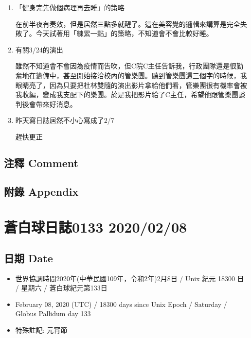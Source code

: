 \documentclass[a5paper, 12pt
]{book}
\providecommand{\tightlist}{%
  \setlength{\itemsep}{0pt}\setlength{\parskip}{0pt}}
\begin{document}
\begin{enumerate}
\def\labelenumi{\arabic{enumi}.}
\item
  「健身完先做個病理再去睡」的策略

  在前半夜有奏效，但是居然三點多就醒了。這在美容覺的邏輯來講算是完全失敗了。今天試著用「練累一點」的策略，不知道會不會比較好睡。
\item
  有關3/24的演出

  雖然不知道會不會因為疫情而告吹，但C院C主任告訴我，行政團隊還是很勤奮地在籌備中，甚至開始接洽校內的管樂團。聽到管樂團這三個字的時候，我眼睛亮了，因為只要把杜林雙隨的演出影片拿給他們看，管樂團很有機率會被我收編，變成我支配下的樂團。於是我把影片給了C主任，希望他跟管樂團談判後會帶來好消息。
\item
  昨天寫日誌居然不小心寫成了2/7

  趕快更正
\end{enumerate}

\hypertarget{ux6ce8ux91cb-comment-67}{%
\subsection{注釋 Comment}\label{ux6ce8ux91cb-comment-67}}

\hypertarget{ux9644ux9304-appendix-68}{%
\subsection{附錄 Appendix}\label{ux9644ux9304-appendix-68}}

\hypertarget{ux84bcux767dux7403ux65e5ux8a8c0133-20200208}{%
\section{蒼白球日誌0133
2020/02/08}\label{ux84bcux767dux7403ux65e5ux8a8c0133-20200208}}

\hypertarget{ux65e5ux671f-date-69}{%
\subsection{日期 Date}\label{ux65e5ux671f-date-69}}

\begin{itemize}
\tightlist
\item
  世界協調時間2020年(中華民國109年，令和2年)2月8日 / Unix 紀元 18300 日
  / 星期六 / 蒼白球紀元第133日
\item
  February 08, 2020 (UTC) / 18300 days since Unix Epoch / Saturday /
  Globus Pallidum day 133
\item
  特殊註記: 元宵節
\end{itemize}
\end{document}
